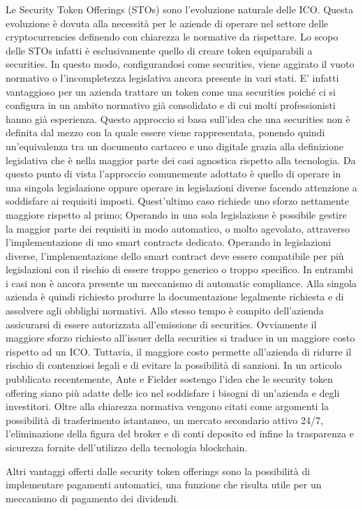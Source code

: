 Le Security Token Offerings (STOs) sono l'evoluzione naturale delle ICO. Questa evoluzione è dovuta alla necessità per le aziende di operare nel settore delle cryptocurrencies definendo con chiarezza le normative da rispettare. Lo scopo delle STOs infatti è esclusivamente quello di creare token equiparabili a securities. In questo modo, configurandosi come securities, viene aggirato il vuoto normativo o l'incompletezza legislativa ancora presente in vari stati. E' infatti vantaggioso per un azienda trattare un token come una securities poiché ci si configura in un ambito normativo già consolidato e di cui molti professionisti hanno già esperienza. Questo approccio si basa sull'idea che una securities non è definita dal mezzo con la quale essere viene rappresentata, ponendo quindi un'equivalenza tra un documento cartaceo e uno digitale grazia alla definizione legislativa che è nella maggior parte dei casi agnostica rispetto alla tecnologia.  Da questo punto di vista l'approccio comunemente adottato è quello di operare in una singola legislazione oppure operare in legislazioni diverse facendo attenzione a soddisfare ai requisiti imposti. Quest'ultimo caso richiede uno sforzo nettamente maggiore rispetto al primo; Operando in una sola legislazione è possibile gestire la maggior parte dei requisiti in modo automatico, o molto agevolato, attraverso l'implementazione di uno smart contracts dedicato. Operando in legislazioni diverse, l'implementazione dello smart contract deve essere compatibile per più legislazioni con il rischio di essere troppo generico o troppo specifico. In entrambi i casi non è ancora presente un meccanismo di automatic compliance. Alla singola azienda è quindi richiesto produrre la documentazione legalmente richiesta e di assolvere agli obblighi normativi. Allo stesso tempo è compito dell'azienda assicurarsi di essere autorizzata all'emissione di securities. Ovviamente il maggiore sforzo richiesto all'issuer della securities si traduce in un maggiore costo rispetto ad un ICO. Tuttavia, il maggiore costo permette all'azienda di ridurre il rischio di contenziosi legali e di evitare la possibilità di sanzioni. 
In un articolo pubblicato recentemente, Ante e Fielder\cite{K35} sostengo l'idea che le security token offering siano più adatte delle ico nel soddisfare i bisogni di un'azienda e degli investitori. Oltre alla chiarezza normativa vengono citati come argomenti la possibilità di trasferimento istantaneo, un mercato secondario attivo 24/7, l'eliminazione della figura del broker e di conti deposito ed infine la trasparenza e sicurezza fornite dell'utilizzo della tecnologia blockchain.\cite{K36} \cite{http://www.scirp.org/journal/paperinformation.aspx?paperid=93164}

Altri vantaggi offerti dalle security token offerings sono la possibilità di implementare pagamenti automatici, una funzione che risulta utile per un meccanismo di pagamento dei dividendi. 
